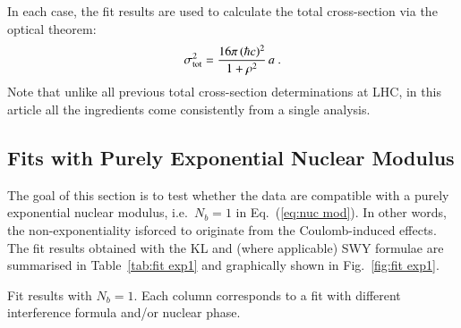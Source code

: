 In each case, the fit results are used to calculate the total cross-section via the optical theorem:
\begin{equation}
\label{eq:si tot}
\sigma_{\rm tot}^2 = {16\pi\, (\hbar c)^2\over 1 + \rho^2}\, a\ .
\end{equation}
Note that unlike all previous total cross-section determinations at LHC, in this article all the ingredients come consistently from a single analysis.


\subsection{Fits with Purely Exponential Nuclear Modulus}
\label{sec:fit exp1}

The goal of this section is to test whether the data are compatible with a purely exponential nuclear modulus, i.e.~$N_b=1$ in Eq.~(\ref{eq:nuc mod}). In other words, the non-exponentiality is\Break forced to originate from the Coulomb-induced effects. The fit results obtained with the KL and (where applicable) SWY formulae are summarised in Table~\ref{tab:fit exp1} and graphically shown in Fig.~\ref{fig:fit exp1}.

\begin{table}
\caption{Fit results with $N_b=1$. Each column corresponds to a fit with different interference formula and/or nuclear phase.}
\vskip-2mm
\label{tab:fit exp1}
\begin{center}
\setlength\tabcolsep{2.5mm}

\end{center}
\end{table}

